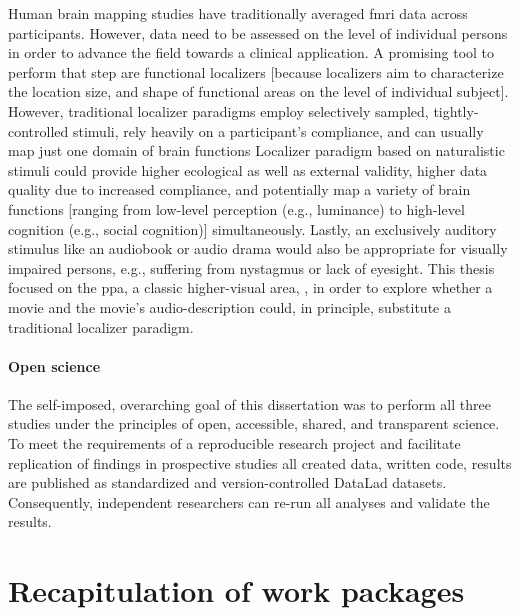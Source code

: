 
Human brain mapping studies have traditionally averaged \ac{fmri} data across
participants.
%
However, data need to be assessed on the level of individual persons in order to
advance the field towards a clinical application.
A promising tool to perform that step are functional localizers [because
localizers aim to characterize the location size, and shape of functional areas
on the level of individual subject].
However, traditional localizer paradigms employ selectively sampled,
tightly-controlled stimuli, rely heavily on a participant's compliance, and can
usually map just one domain of brain functions
Localizer paradigm based on naturalistic stimuli could provide higher ecological
as well as external validity, higher data quality due to increased compliance,
and potentially map a variety of brain functions [ranging from low-level
perception (e.g., luminance) to high-level cognition (e.g., social cognition)]
simultaneously.
Lastly, an exclusively auditory stimulus like an audiobook or audio drama would
also be appropriate for visually impaired persons, e.g., suffering from
nystagmus or lack of eyesight.
This thesis focused on the \ac{ppa}, a classic higher-visual area,
\citep{epstein1998ppa}, in order to explore whether a movie and the movie's
audio-description could, in principle, substitute a traditional localizer
paradigm.

\paragraph{Open science}
The self-imposed, overarching goal of this dissertation was to perform all three
studies under the principles of open, accessible, shared, and transparent
science.
To meet the requirements of a reproducible research project and facilitate
replication of findings in prospective studies all created data, written code,
results are published as standardized and version-controlled DataLad
\citep[\href{www.datalad.org}{datalad.org};][]{halchenko2021datalad} datasets.
Consequently, independent researchers can re-run all analyses and validate the
results.


\section{Recapitulation of work packages}


